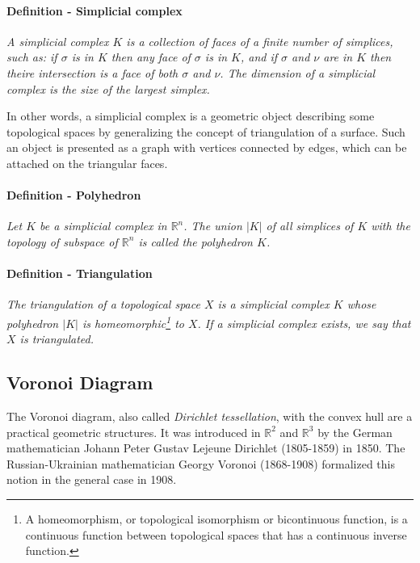 \paragraph{Definition - Simplicial complex}
{
\it A simplicial complex $K$ is a collection of faces of a finite number of simplices, such as: if $\sigma$ is in $K$ then any face of $\sigma$ is in $K$, and if $\sigma$ and $\nu$ are in $K$ then theire intersection is a face of both $\sigma$ and $\nu$. The dimension of a simplicial complex is the size of the largest simplex.
}

In other words, a simplicial complex is a geometric object describing some topological spaces by generalizing the concept of triangulation of a surface. Such an object is presented as a graph with vertices connected by edges, which can be attached on the triangular faces.

\paragraph{Definition - Polyhedron}
{
\it Let $K$ be a simplicial complex in $\mathbb{R}^{n}$. The union $|K|$ of all simplices of $K$ with the topology of subspace of $\mathbb{R}^{n}$ is called the polyhedron $K$.
}

\paragraph{Definition - Triangulation}
{
\it The triangulation of a topological space $X$ is a simplicial complex $K$ whose polyhedron $|K|$ is homeomorphic\footnote{A homeomorphism, or topological isomorphism or bicontinuous function, is a continuous function between topological spaces that has a continuous inverse function.} to $X$. If a simplicial complex exists, we say that $X$ is triangulated.
}

\subsection{Voronoi Diagram}

The Voronoi diagram, also called {\it Dirichlet tessellation}, with the convex hull are a practical geometric structures. It was introduced in  $\mathbb {R}^{2}$ and $\mathbb{R}^{3}$ by the German mathematician Johann Peter Gustav Lejeune Dirichlet (1805-1859) in 1850. The Russian-Ukrainian mathematician Georgy Voronoi (1868-1908) formalized this notion in the general case in 1908.\\

